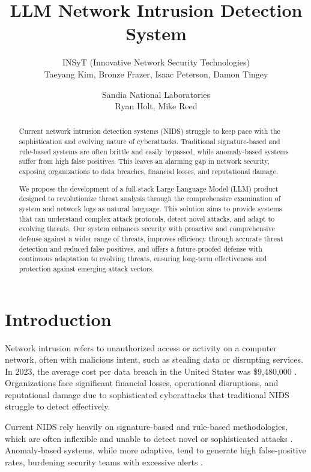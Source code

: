 \documentclass[12pt]{article}
\title{LLM Network Intrusion Detection System}
\author{
    INSyT (Innovative Network Security Technologies)\\
    Taeyang Kim, Bronze Frazer, Isaac Peterson, Damon Tingey\\
    \and
    Sandia National Laboratories\\
    Ryan Holt, Mike Reed\\
}
\date{}
\begin{document}
\maketitle

\begin{abstract}
Current network intrusion detection systems (NIDS) struggle to keep pace with the sophistication and evolving nature of cyberattacks. Traditional signature-based and rule-based systems are often brittle and easily bypassed, while anomaly-based systems suffer from high false positives. This leaves an alarming gap in network security, exposing organizations to data breaches, financial losses, and reputational damage.

We propose the development of a full-stack Large Language Model (LLM) product designed to revolutionize threat analysis through the comprehensive examination of system and network logs as natural language. This solution aims to provide systems that can understand complex attack protocols, detect novel attacks, and adapt to evolving threats. Our system enhances security with proactive and comprehensive defense against a wider range of threats, improves efficiency through accurate threat detection and reduced false positives, and offers a future-proofed defense with continuous adaptation to evolving threats, ensuring long-term effectiveness and protection against emerging attack vectors.
\end{abstract}

\section{Introduction}

Network intrusion refers to unauthorized access or activity on a computer network, often with malicious intent, such as stealing data or disrupting services. In 2023, the average cost per data breach in the United States was \$9,480,000 \citep{databreachreport}. Organizations face significant financial losses, operational disruptions, and reputational damage due to sophisticated cyberattacks that traditional NIDS struggle to detect effectively.

Current NIDS rely heavily on signature-based and rule-based methodologies, which are often inflexible and unable to detect novel or sophisticated attacks \citep{traditionalnids}. Anomaly-based systems, while more adaptive, tend to generate high false-positive rates, burdening security teams with excessive alerts \citep{anomalyissues}.
\end{document}
